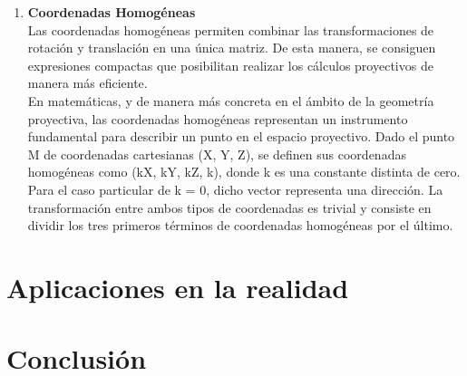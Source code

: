 \documentclass[a4,10pt]{article}
\begin{document}
\begin{enumerate}
\item \textbf{Coordenadas Homogéneas}\\
Las coordenadas homogéneas permiten combinar las transformaciones de rotación y translación en una única matriz. De esta manera, se consiguen expresiones compactas que posibilitan realizar los cálculos proyectivos de manera más eficiente.\\ 
En matemáticas, y de manera más concreta en el ámbito de la geometría proyectiva, las coordenadas homogéneas representan un instrumento fundamental para describir un punto en el espacio proyectivo. Dado el punto M de coordenadas cartesianas (X, Y, Z), se definen sus coordenadas homogéneas como (kX, kY, kZ, k), donde k es una constante distinta de cero. Para el caso particular de k = 0, dicho vector representa una dirección. La transformación entre ambos tipos de coordenadas es trivial y consiste en dividir los tres primeros términos de coordenadas homogéneas por el último.


\end{enumerate}

\section{Aplicaciones en la realidad}




\section{Conclusión}




\end{document}
